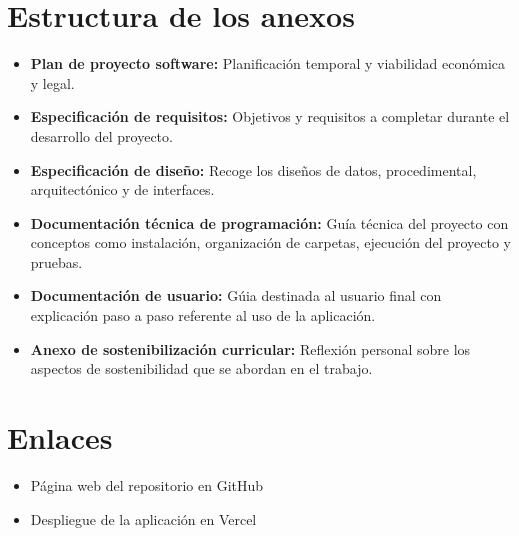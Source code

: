 \section{Estructura de los anexos}
\begin{itemize}
\tightlist
    \item 
        \textbf{Plan de proyecto software: }Planificación temporal y viabilidad económica y legal.
    \item 
        \textbf{Especificación de requisitos: }Objetivos y requisitos a completar durante el desarrollo del proyecto.
    \item 
        \textbf{Especificación de diseño: }Recoge los diseños de datos, procedimental, arquitectónico y de interfaces.
    \item 
        \textbf{Documentación técnica de programación: }Guía técnica del proyecto con conceptos como instalación, organización de carpetas, ejecución del proyecto y pruebas.
    \item 
        \textbf{Documentación de usuario: }Gúia destinada al usuario final con explicación paso a paso referente al uso de la aplicación.
    \item 
        \textbf{Anexo de sostenibilización curricular: }Reflexión personal sobre los aspectos de sostenibilidad que se abordan en el trabajo.
\end{itemize}

\section{Enlaces}
\begin{itemize}
\tightlist
    \item 
        Página web del repositorio en GitHub \cite{draw-er-app:repo}
    \item 
        Despliegue de la aplicación en Vercel \cite{draw-er-app:web}
\end{itemize}

